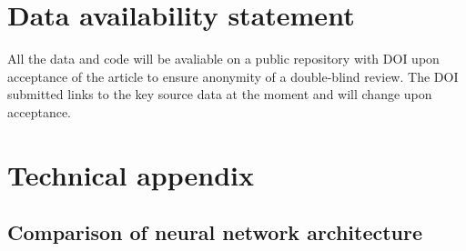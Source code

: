 \documentclass[]{interact}
\theoremstyle{plain}%
\theoremstyle{definition}
\theoremstyle{remark}
\begin{document}
\section*{Data availability statement}

All the data and code will be avaliable on a public repository with DOI upon acceptance
of the article to ensure anonymity of a double-blind review. The DOI submitted links
to the key source data at the moment and will change upon acceptance.




\clearpage

\appendix
\section{Technical appendix}
\label{sec:appendix}

\subsection{Comparison of neural network architecture}
\label{sec:appendixA}
\end{document}
